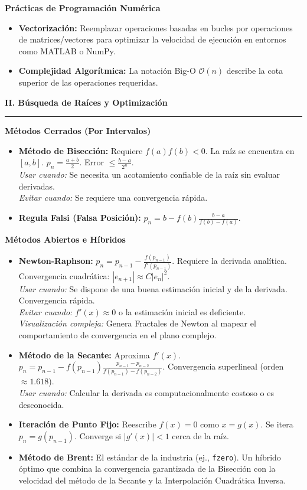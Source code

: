 \documentclass[10pt, landscape, twocolumn]{article}
\newcommand{\cheatsheetsection}[1]{
    \vspace{0.6em}
    {\color{themeblue}\large\bfseries #1} \par
    \vspace{-0.5em}
    {\color{themeblue}\rule{\linewidth}{1pt}} \par
    \vspace{0.2em}
}
\newcommand{\cheatsheetsubsection}[1]{
    \vspace{0.4em}
    {\color{themeblue}\normalsize\bfseries #1} \par
    \vspace{0.1em}
}
\begin{document}
\cheatsheetsubsection{Prácticas de Programación Numérica}
\begin{itemize}[leftmargin=*, nosep]
    \item \textbf{Vectorización:} Reemplazar operaciones basadas en bucles por operaciones de matrices/vectores para optimizar la velocidad de ejecución en entornos como MATLAB o NumPy.
    \item \textbf{Complejidad Algorítmica:} La notación Big-O $\mathcal{O}(n)$ describe la cota superior de las operaciones requeridas.
\end{itemize}

\cheatsheetsection{II. Búsqueda de Raíces y Optimización}

\cheatsheetsubsection{Métodos Cerrados (Por Intervalos)}
\begin{itemize}[leftmargin=*, nosep]
    \item \textbf{Método de Bisección:} Requiere $f(a)f(b) < 0$. La raíz se encuentra en $[a,b]$.
    $p_n = \frac{a+b}{2}$. Error $\leq \frac{b-a}{2^n}$. \\
    \textit{Usar cuando:} Se necesita un acotamiento confiable de la raíz sin evaluar derivadas. \\
    \textit{Evitar cuando:} Se requiere una convergencia rápida.
    \item \textbf{Regula Falsi (Falsa Posición):} $p_n = b - f(b)\frac{b-a}{f(b)-f(a)}$.
\end{itemize}

\cheatsheetsubsection{Métodos Abiertos e Híbridos}
\begin{itemize}[leftmargin=*, nosep]
    \item \textbf{Newton-Raphson:} $p_n = p_{n-1} - \frac{f(p_{n-1})}{f'(p_{n-1})}$. 
    Requiere la derivada analítica. Convergencia cuadrática: $|e_{n+1}| \approx C |e_n|^2$. \\
    \textit{Usar cuando:} Se dispone de una buena estimación inicial y de la derivada. Convergencia rápida. \\
    \textit{Evitar cuando:} $f'(x) \approx 0$ o la estimación inicial es deficiente. \\
    \textit{Visualización compleja:} Genera Fractales de Newton al mapear el comportamiento de convergencia en el plano complejo.
    \item \textbf{Método de la Secante:} Aproxima $f'(x)$.
    $p_n = p_{n-1} - f(p_{n-1})\frac{p_{n-1}-p_{n-2}}{f(p_{n-1})-f(p_{n-2})}$. 
    Convergencia superlineal (orden $\approx 1.618$). \\
    \textit{Usar cuando:} Calcular la derivada es computacionalmente costoso o es desconocida.
    \item \textbf{Iteración de Punto Fijo:} Reescribe $f(x)=0$ como $x = g(x)$. Se itera $p_n = g(p_{n-1})$. Converge si $|g'(x)| < 1$ cerca de la raíz.
    \item \textbf{Método de Brent:} El estándar de la industria (ej., \texttt{fzero}). Un híbrido óptimo que combina la convergencia garantizada de la Bisección con la velocidad del método de la Secante y la Interpolación Cuadrática Inversa.
\end{itemize}
\end{document}
